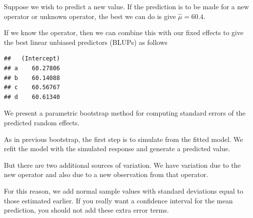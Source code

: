 \documentclass[
  ignorenonframetext,
]{beamer}
\newenvironment{Shaded}{\begin{snugshade}}{\end{snugshade}}
\newcommand{\FunctionTok}[1]{\textcolor[rgb]{0.00,0.00,0.00}{#1}}
\newcommand{\NormalTok}[1]{#1}
\newcommand{\SpecialCharTok}[1]{\textcolor[rgb]{0.00,0.00,0.00}{#1}}
\begin{document}
\begin{frame}[fragile]{}
\protect\hypertarget{section-10}{}
Suppose we wish to predict a new value. If the prediction is to be made
for a new operator or unknown operator, the best we can do is give
\(\hat\mu = 60.4\).

If we know the operator, then we can combine this with our fixed effects
to give the best linear unbiased predictors (BLUPs) as follows

\vspace{12pt}

\begin{Shaded}
\end{Shaded}

\begin{verbatim}
##   (Intercept)
## a    60.27806
## b    60.14088
## c    60.56767
## d    60.61340
\end{verbatim}
\end{frame}

\begin{frame}{}
\protect\hypertarget{section-11}{}
We present a parametric bootstrap method for computing standard errors
of the predicted random effects.

As in previous bootstrap, the first step is to simulate from the fitted
model. We refit the model with the simulated response and generate a
predicted value.

But there are two additional sources of variation. We have variation due
to the new operator and also due to a new observation from that
operator.

For this reason, we add normal sample values with standard deviations
equal to those estimated earlier. If you really want a confidence
interval for the mean prediction, you should not add these extra error
terms.
\end{frame}
\end{document}
